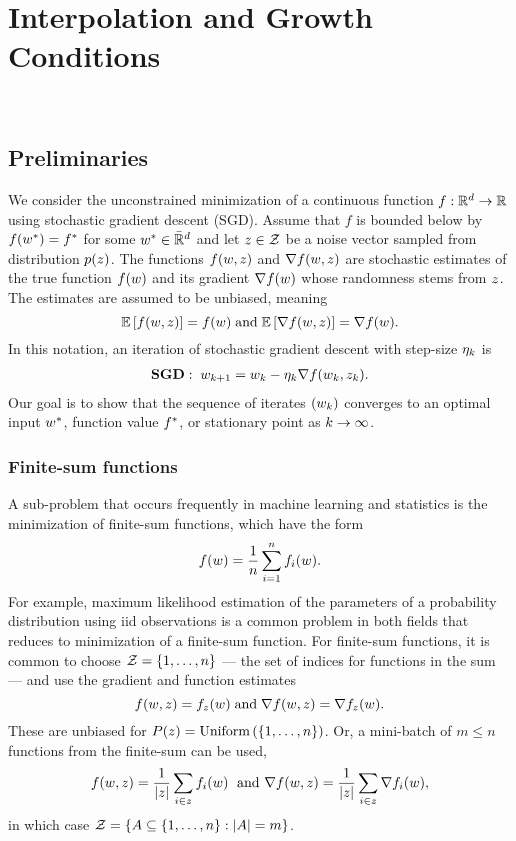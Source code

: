 
\chapter{Interpolation and Growth Conditions}~\label{ch:interpolation-gc}

\section{Preliminaries}\label{sec:setup}

We consider the unconstrained minimization of a continuous function \( f : \mathbb{R}^d \rightarrow \mathbb{R} \) using stochastic gradient descent (SGD).
Assume that \( f \) is bounded below by \( f(w^*) = f^* \) for some \( w^* \in \bar {\mathbb{R}}^d \) and let \( z \in \mathcal{Z} \) be a noise vector sampled from distribution \( p(z) \).
The functions \( f(w,z) \) and \( \nabla f(w, z) \) are stochastic estimates of the true function \( f(w) \) and its gradient \(\nabla f(w) \) whose randomness stems from \( z \).
The estimates are assumed to be unbiased, meaning
\[ \mathbb{E} \left[f(w, z)\right] = f(w)  \; \text{and} \; \mathbb{E} \left[ \nabla f(w, z) \right] = \nabla f(w). \]
In this notation, an iteration of stochastic gradient descent with step-size \( \eta_k \) is
\begin{align}
    \textbf{SGD}: \; w_{k+1} = w_k - \eta_k \nabla f(w_k, z_k). \label{eq:sgd}
\end{align}
Our goal is to show that the sequence of iterates \( \left(w_k\right) \) converges to an optimal input \( w^* \), function value \( f^* \), or stationary point as \( k \rightarrow \infty \).

\subsection{Finite-sum functions}\label{sec:finite_sum}

A sub-problem that occurs frequently in machine learning and statistics is the minimization of finite-sum functions, which have the form
\[ f(w) = \frac{1}{n} \sum_{i=1}^n f_i(w). \]
For example, maximum likelihood estimation of the parameters of a probability distribution using iid observations is a common problem in both fields that reduces to minimization of a finite-sum function.
For finite-sum functions, it is common to choose \( \mathcal{Z} = \left\{1, \dots, n\right\} \) --- the set of indices for functions in the sum --- and use the gradient and function estimates
\[f(w, z) = f_z(w) \; \text{and} \; \nabla f(w, z) = \nabla f_z(w). \]
These are unbiased for \( P(z) = \text{Uniform}\left(\left\{1, \dots, n\right\}\right) \).
Or, a mini-batch of \( m \leq n \) functions from the finite-sum can be used,
\[ f(w, z) = \frac{1}{|z|} \sum_{i \in z} f_i(w) \; \text{ and } \nabla f(w, z) = \frac{1}{|z|} \sum_{i \in z} \nabla f_i(w), \]
in which case \( \mathcal{Z} = \left\{ A \subseteq \left\{1, \dots, n\right\} : |A| = m \right\} \).

